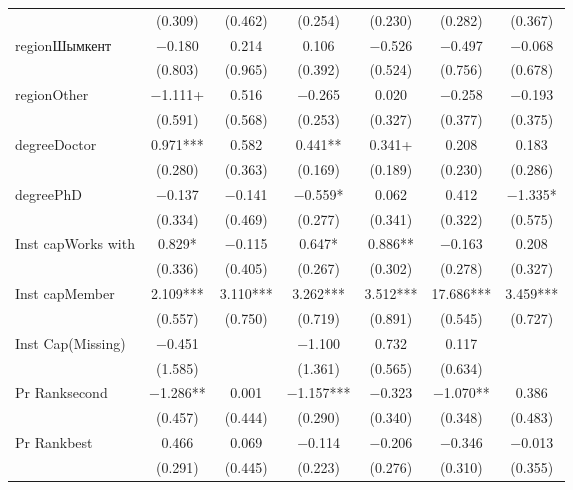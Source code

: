 \begin{table}
\begin{tabular}[t]{lcccccc}
 & (\num{0.309}) & (\num{0.462}) & (\num{0.254}) & (\num{0.230}) & (\num{0.282}) & (\num{0.367})\\
regionШымкент & \num{-0.180} & \num{0.214} & \num{0.106} & \num{-0.526} & \num{-0.497} & \num{-0.068}\\
 & (\num{0.803}) & (\num{0.965}) & (\num{0.392}) & (\num{0.524}) & (\num{0.756}) & (\num{0.678})\\
regionOther & \num{-1.111}+ & \num{0.516} & \num{-0.265} & \num{0.020} & \num{-0.258} & \num{-0.193}\\
 & (\num{0.591}) & (\num{0.568}) & (\num{0.253}) & (\num{0.327}) & (\num{0.377}) & (\num{0.375})\\
degreeDoctor & \num{0.971}*** & \num{0.582} & \num{0.441}** & \num{0.341}+ & \num{0.208} & \num{0.183}\\
 & (\num{0.280}) & (\num{0.363}) & (\num{0.169}) & (\num{0.189}) & (\num{0.230}) & (\num{0.286})\\
degreePhD & \num{-0.137} & \num{-0.141} & \num{-0.559}* & \num{0.062} & \num{0.412} & \num{-1.335}*\\
 & (\num{0.334}) & (\num{0.469}) & (\num{0.277}) & (\num{0.341}) & (\num{0.322}) & (\num{0.575})\\
Inst capWorks with & \num{0.829}* & \num{-0.115} & \num{0.647}* & \num{0.886}** & \num{-0.163} & \num{0.208}\\
 & (\num{0.336}) & (\num{0.405}) & (\num{0.267}) & (\num{0.302}) & (\num{0.278}) & (\num{0.327})\\
Inst capMember & \num{2.109}*** & \num{3.110}*** & \num{3.262}*** & \num{3.512}*** & \num{17.686}*** & \num{3.459}***\\
 & (\num{0.557}) & (\num{0.750}) & (\num{0.719}) & (\num{0.891}) & (\num{0.545}) & (\num{0.727})\\
Inst Cap(Missing) & \num{-0.451} &  & \num{-1.100} & \num{0.732} & \num{0.117} & \\
 & (\num{1.585}) &  & (\num{1.361}) & (\num{0.565}) & (\num{0.634}) & \\
Pr Ranksecond & \num{-1.286}** & \num{0.001} & \num{-1.157}*** & \num{-0.323} & \num{-1.070}** & \num{0.386}\\
 & (\num{0.457}) & (\num{0.444}) & (\num{0.290}) & (\num{0.340}) & (\num{0.348}) & (\num{0.483})\\
Pr Rankbest & \num{0.466} & \num{0.069} & \num{-0.114} & \num{-0.206} & \num{-0.346} & \num{-0.013}\\
 & (\num{0.291}) & (\num{0.445}) & (\num{0.223}) & (\num{0.276}) & (\num{0.310}) & (\num{0.355})\\

\end{tabular}
\end{table}
